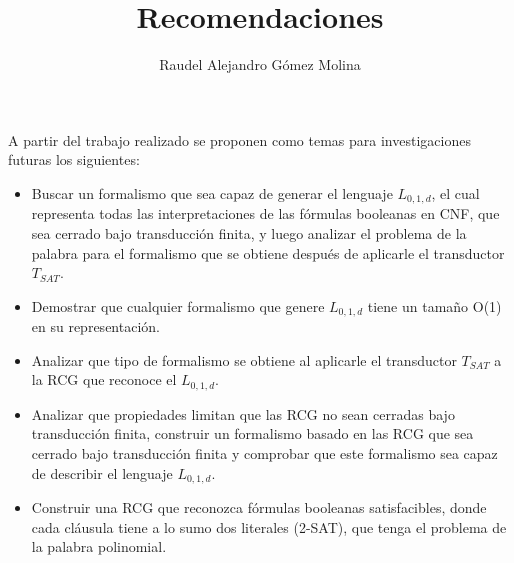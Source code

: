 \documentclass[12pt]{article}
\title{Recomendaciones}
\author{Raudel Alejandro Gómez Molina}
\begin{document}
\maketitle

A partir del trabajo realizado se proponen como temas para investigaciones futuras los
siguientes:

\begin{itemize}
    \item Buscar un formalismo que sea capaz de generar el lenguaje $L_{0,1,d}$, el cual representa todas las interpretaciones
          de las fórmulas booleanas en CNF, que sea cerrado bajo transducción finita, y luego analizar el problema de la palabra para
          el formalismo que se obtiene después de aplicarle el transductor $T_{SAT}$.
    \item Demostrar que cualquier formalismo que genere $L_{0,1,d}$ tiene un tamaño O(1) en su representación.
    \item Analizar que tipo de formalismo se obtiene al aplicarle el transductor $T_{SAT}$ a la RCG que reconoce
          el $L_{0,1,d}$.
    \item  Analizar que propiedades limitan que las RCG no sean cerradas bajo transducción finita, construir
          un formalismo basado en las RCG que sea cerrado bajo transducción finita y comprobar que este formalismo
          sea capaz de describir el lenguaje $L_{0,1,d}$.
          \item Construir una RCG que reconozca fórmulas booleanas satisfacibles, donde cada cláusula tiene a lo sumo dos literales (2-SAT),
          que tenga el problema de la palabra polinomial.
\end{itemize}
\end{document}
